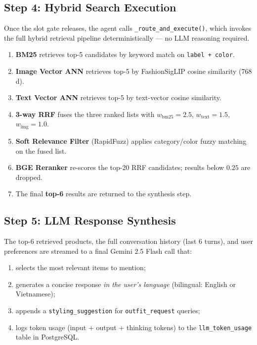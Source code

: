\documentclass[12pt,a4paper]{article}
\begin{document}
\subsection{Step 4: Hybrid Search Execution}

Once the slot gate releases, the agent calls
\texttt{\_route\_and\_execute()}, which invokes the full hybrid
retrieval pipeline deterministically --- no LLM reasoning required.

\begin{enumerate}[label=(\arabic*)]
  \item \textbf{BM25} retrieves top-5 candidates by keyword match
        on \texttt{label + color}.
  \item \textbf{Image Vector ANN} retrieves top-5 by FashionSigLIP
        cosine similarity (768\,d).
  \item \textbf{Text Vector ANN} retrieves top-5 by text-vector
        cosine similarity.
  \item \textbf{3-way RRF} fuses the three ranked lists with
        $w_{\text{bm25}}=2.5$, $w_{\text{text}}=1.5$,
        $w_{\text{img}}=1.0$.
  \item \textbf{Soft Relevance Filter} (RapidFuzz) applies
        category/color fuzzy matching on the fused list.
  \item \textbf{BGE Reranker} re-scores the top-20 RRF candidates;
        results below $0.25$ are dropped.
  \item The final \textbf{top-6} results are returned to the
        synthesis step.
\end{enumerate}

\subsection{Step 5: LLM Response Synthesis}

The top-6 retrieved products, the full conversation history
(last 6 turns), and user preferences are streamed to a final
Gemini 2.5 Flash call that:
\begin{enumerate}[label=(\arabic*)]
  \item selects the most relevant items to mention;
  \item generates a concise response
        \emph{in the user's language} (bilingual: English or Vietnamese);
  \item appends a \texttt{styling\_suggestion} for
        \texttt{outfit\_request} queries;
  \item logs token usage (input + output + thinking tokens)
        to the \texttt{llm\_token\_usage} table in PostgreSQL.
\end{enumerate}
\end{document}
